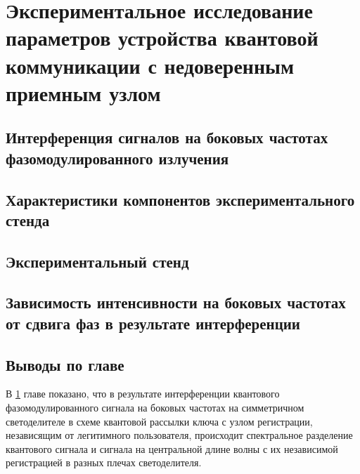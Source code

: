 \chapter{Экспериментальное исследование параметров устройства квантовой коммуникации с недоверенным приемным узлом} \label{ch:ch5}
\section{Интерференция сигналов на боковых частотах фазомодулированного излучения} \label{sec:ch5/sec1}




\section{Характеристики компонентов экспериментального стенда} \label{ch:ch5/sect2}


\section{Экспериментальный стенд} \label{ch:ch5/sect3}


\section{Зависимость интенсивности на боковых частотах от сдвига фаз в результате интерференции} \label{ch:ch5/sect4}


\section{Выводы по главе} \label{ch:ch5/sect5}


В \ref{ch:ch5} главе показано, что в результате интерференции квантового фазомодулированного сигнала на боковых частотах на симметричном светоделителе в схеме квантовой рассылки ключа с узлом регистрации, независящим от легитимного пользователя, происходит спектральное разделение квантового сигнала и сигнала на центральной длине волны с их независимой регистрацией в разных плечах светоделителя. 